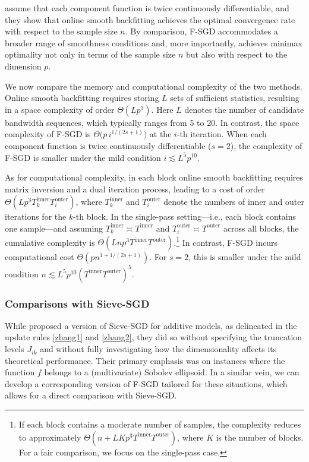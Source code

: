\cite{yang2023online} assume that each component function is twice continuously differentiable, and they show that online smooth backfitting achieves the optimal convergence rate with respect to the sample size $n$. By comparison, F-SGD accommodates a broader range of smoothness conditions and, more importantly, achieves minimax optimality not only in terms of the sample size $n$ but also with respect to the dimension $p$.  

We now compare the memory and computational complexity of the two methods. 
Online smooth backfitting requires storing $L$ sets of sufficient statistics, 
resulting in a space complexity of order $\Theta(Lp^3)$. 
Here $L$ denotes the number of candidate bandwidth sequences, 
which typically ranges from 5 to 20. 
In contrast, the space complexity of F-SGD is 
$\Theta\bigl(p\, i^{1/(2s+1)}\bigr)$ at the $i$-th iteration. 
When each component function is twice continuously differentiable ($s=2$), 
the complexity of F-SGD is smaller under the mild condition 
$i \lesssim L^5 p^{10}$.

As for computational complexity, in each block online smooth backfitting 
requires matrix inversion and a dual iteration process, 
leading to a cost of order $\Theta(Lp^3 T^{\text{inner}}_k T^{\text{outer}}_i)$, 
where $T^{\text{inner}}_k$ and $T^{\text{outer}}_i$ denote the numbers of inner 
and outer iterations for the $k$-th block. 
In the single-pass setting---i.e., each block contains one sample---and assuming 
$T^{\text{inner}}_k \asymp T^{\text{inner}}$ and 
$T^{\text{outer}}_i \asymp T^{\text{outer}}$ across all blocks, 
the cumulative complexity is 
$\Theta(L n p^3 T^{\text{inner}} T^{\text{outer}})$.\footnote{If each block 
contains a moderate number of samples, the complexity reduces to approximately 
$\Theta(n + LKp^3 T^{\text{inner}} T^{\text{outer}})$, where $K$ is the number 
of blocks. For a fair comparison, we focus on the single-pass case.} 
In contrast, F-SGD incurs computational cost 
$\Theta(p n^{1+1/(2s+1)})$. 
For $s=2$, this is smaller under the mild condition 
$n \lesssim L^5 p^{10}(T^{\text{inner}}T^{\text{outer}})^5$.
  




\subsubsection{Comparisons with Sieve-SGD}\label{subsubsec:sieve}

While \cite{zhang2022sieve} proposed a version of Sieve-SGD for additive models, as delineated in the update rules \eqref{zhang1} and \eqref{zhang2}, they did so without specifying the truncation levels $J_{ik}$ and without fully investigating how the dimensionality affects its theoretical performance. Their primary emphasis was on instances where the function $f$ belongs to a (multivariate) Sobolev ellipsoid. In a similar vein, we can develop a corresponding version of F-SGD tailored for these situations, which allows for a direct comparison with Sieve-SGD.

